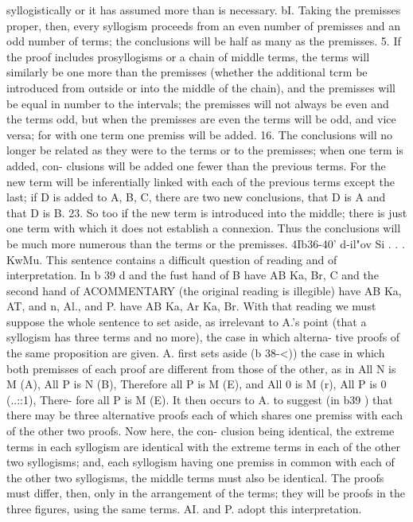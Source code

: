 {{{{{{{{{{{{{{{syllogistically or it has assumed more than is necessary.
bI. Taking the premisses proper, then, every syllogism proceeds
from an even number of premisses and an odd number of terms;
the conclusions will be half as many as the premisses.
5. If the proof includes prosyllogisms or a chain of middle
terms, the terms will similarly be one more than the premisses
(whether the additional tcrm be introduced from outside or into
the middle of the chain), and the premisses will be equal in
number to the intervals; the premisses will not always be even
and the terms odd, but when the premisses are even the terms
will be odd, and vice versa; for with one term one premiss will
be added.
16. The conclusions will no longer be related as they were to
the terms or to the premisses; when one term is added, con-
clusions will be added one fewer than the previous terms. For the
new term will be inferentially linked with each of the previous
terms except the last; if D is added to A, B, C, there are two new
conclusions, that D is A and that D is B.
23. So too if the new term is introduced into the middle; there
is just one term with which it does not establish a connexion.
Thus the conclusions will be much more numerous than the terms
or the premisses.
4Ib36-40' d-il"ov Si . . . KwMu. This sentence contains a
difficult question of reading and of interpretation. In b 39 d and
the fust hand of B have AB Ka, Br, C and the second hand of ACOMMENTARY
(the original reading is illegible) have AB Ka, AT, and n, Al., and
P. have AB Ka, Ar Ka, Br. With that reading we must suppose
the whole sentence to set aside, as irrelevant to A.'s point (that
a syllogism has three terms and no more), the case in which alterna-
tive proofs of the same proposition are given. A. first sets aside
(b 38-<)) the case in which both premisses of each proof are different
from those of the other, as in All N is M (A), All P is N (B),
Therefore all P is M (E), and All 0 is M (r), All P is 0 (..::1), There-
fore all P is M (E). It then occurs to A. to suggest (in b39 ) that
there may be three alternative proofs each of which shares one
premiss with each of the other two proofs. Now here, the con-
clusion being identical, the extreme terms in each syllogism are
identical with the extreme terms in each of the other two
syllogisms; and, each syllogism having one premiss in common
with each of the other two syllogisms, the middle terms must
also be identical. The proofs must differ, then, only in the
arrangement of the terms; they will be proofs in the three figures,
using the same terms. AI. and P. adopt this interpretation.
}}}}}}}}}}}}}}}
